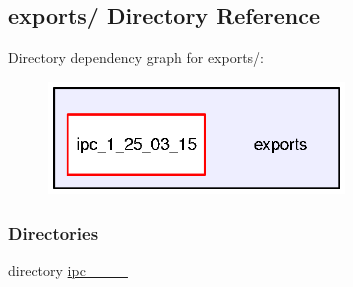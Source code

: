 \subsection{exports/ Directory Reference}
\label{dir_2298ed0e5bfee6f293aea6c715ac7f7c}
Directory dependency graph for exports/\-:
\nopagebreak
\begin{figure}[H]
\begin{center}
\leavevmode
\includegraphics[width=223pt]{dir_2298ed0e5bfee6f293aea6c715ac7f7c_dep}
\end{center}
\end{figure}
\subsubsection*{Directories}
\begin{DoxyCompactItemize}
\item 
directory \hyperlink{dir_010092f914561f4ed3899313fd63b3c7}{ipc\-\_\-\_\-\_\-\_}
\end{DoxyCompactItemize}
